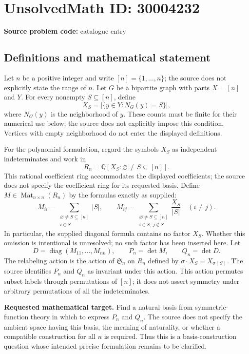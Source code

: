 \documentclass[11pt]{article}
\newcommand{\Q}{\mathbb{Q}}
\begin{document}
\section*{UnsolvedMath ID: 30004232}
\textbf{Source problem code:} catalogue entry
\subsection{Definitions and mathematical statement}
Let \(n\) be a positive integer and write \([n]=\{1,\ldots,n\}\); the source does not explicitly state the range of \(n\). Let \(G\) be a bipartite graph with parts \(X=[n]\) and \(Y\). For every nonempty \(S\subseteq[n]\), define
\[
X_S=\bigl|\{y\in Y:N_G(y)=S\}\bigr|,
\]
where \(N_G(y)\) is the neighborhood of \(y\). These counts must be finite for their numerical use below; the source does not explicitly impose this condition. Vertices with empty neighborhood do not enter the displayed definitions.

For the polynomial formulation, regard the symbols \(X_S\) as independent indeterminates and work in
\[
R_n=\Q[X_S:\varnothing\ne S\subseteq[n]].
\]
This rational coefficient ring accommodates the displayed coefficients; the source does not specify the coefficient ring for its requested basis. Define \(M\in\operatorname{Mat}_{n\times n}(R_n)\) by the formulas exactly as supplied:
\[
M_{ii}=\sum_{\substack{\varnothing\ne S\subseteq[n]\\i\in S}}|S|,
\qquad
M_{ij}=\sum_{\substack{\varnothing\ne S\subseteq[n]\\i\in S,\ j\notin S}}\frac{X_S}{|S|}
\quad(i\ne j).
\]
In particular, the supplied diagonal formula contains no factor \(X_S\). Whether this omission is intentional is unresolved; no such factor has been inserted here. Let
\[
D=\operatorname{diag}(M_{11},\ldots,M_{nn}),\qquad P_n=\det M,\qquad Q_n=\det D.
\]
The relabeling action is the action of \(\mathfrak S_n\) on \(R_n\) defined by \(\sigma\cdot X_S=X_{\sigma(S)}\). The source identifies \(P_n\) and \(Q_n\) as invariant under this action. This action permutes subset labels through permutations of \([n]\); it does not assert symmetry under arbitrary permutations of all the indeterminates.

\textbf{Requested mathematical target.} Find a natural basis from symmetric-function theory in which to express \(P_n\) and \(Q_n\). The source does not specify the ambient space having this basis, the meaning of naturality, or whether a compatible construction for all \(n\) is required. Thus this is a basis-construction question whose intended precise formulation remains to be clarified.
\end{document}
